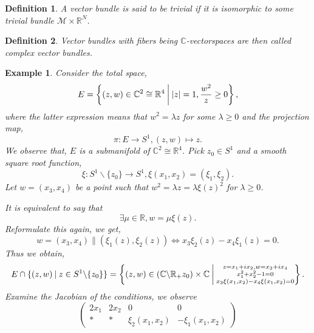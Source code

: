 \documentclass[10pt]{article}
\newtheorem{definition}{Definition}[section]
\newtheorem{example}{Example}[section]
\newcommand{\R}[0]{\mathbb{R}}
\newcommand{\C}[0]{\mathbb{C}}
\newcommand{\M}[0]{\mathcal{M}}
\newcommand{\sep}[0]{\:|\:}
\begin{document}
\begin{definition}
  A vector bundle is said to be trivial if it is isomorphic to some trivial bundle $\M\times \R^N$.
\end{definition}

\begin{definition}
  Vector bundles with fibers being $\C$-vectorspaces are then called complex vector bundles.
\end{definition}
\begin{example}Consider the total space,
  \begin{equation*}
    E = \left\{(z,w)\in\C^2\cong\R^4\:\bigg{|}\: \vert z\vert = 1, {\frac {w^2} {z}}\geq 0\right\},
  \end{equation*}
  where the latter expression means that $w^2 = \lambda z$ for some $\lambda\geq0$ and the projection map,
  \begin{equation*}
    \pi:E\to S^1,(z,w)\mapsto z.
  \end{equation*}
  We observe that, $E$ is a submanifold of $\C^2\cong\R^4$. Pick $z_0\in S^1$ and a smooth square root function,
  \begin{equation*}
    \xi:S^1\backslash\{z_0\}\to S^1,\xi(x_1,x_2) = (\xi_1,\xi_2).
  \end{equation*}
  Let $w=(x_3,x_4)$ be a point such that $w^2 = \lambda z = \lambda\xi(z)^2$ for $\lambda\geq0$.
  \par It is equivalent to say that 
  \begin{equation*}
    \exists \mu\in\R,w = \mu\xi(z).
  \end{equation*}
  Reformulate this again, we get,
  \begin{equation*}
    w = (x_3,x_4)\parallel(\xi_1(z),\xi_2(z))\Leftrightarrow x_3\xi_2(z)-x_4\xi_1(z) = 0.
  \end{equation*}
  Thus we obtain,
  \begin{equation*}
    E\cap\{(z,w)\sep z\in S^1\backslash\{z_0\}\} = \left\{(z,w)\in(\C\backslash\R_+z_0)\times \C\:\bigg{|}\:\substack{z=x_1+ix_2,w=x_3+ix_4\\x_1^2+x_2^2-1=0\\ x_3\xi(x_1,x_2)-x_4\xi(x_1,x_2)=0}\right\}.
  \end{equation*}
  Examine the Jacobian of the conditions, we observe
  \begin{equation*}
    \begin{pmatrix}
      2x_1 & 2x_2 & 0 & 0\\
      \ast & \ast & \xi_2(x_1,x_2)&-\xi_1(x_1,x_2)

\end{pmatrix}
\end{equation*}
\end{example}
\end{document}

